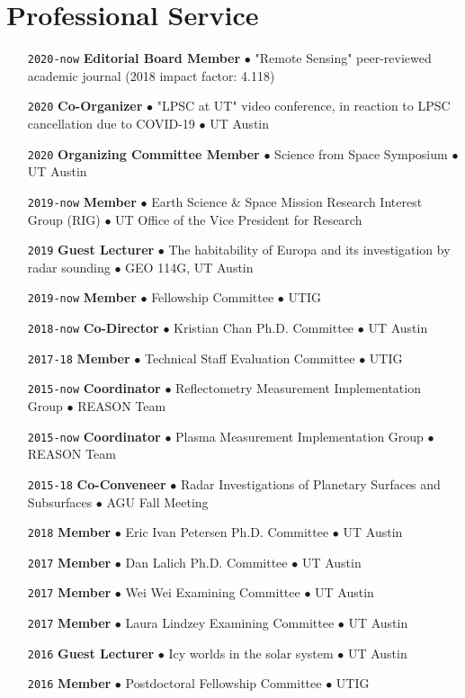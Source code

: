 \section*{Professional Service}

\begin{itemize}[leftmargin=5.8em, labelsep=1.5em]
    \setlength\itemsep{-.5em}
    \item[\texttt{2020-now}] \textbf{Editorial Board Member} $\bullet$ "Remote Sensing" peer-reviewed academic journal (2018 impact factor: 4.118)
    \item[\texttt{2020}] \textbf{Co-Organizer} $\bullet$ "LPSC at UT" video conference, in reaction to LPSC cancellation due to COVID-19 $\bullet$ UT Austin
    \item[\texttt{2020}] \textbf{Organizing Committee Member} $\bullet$ Science from Space Symposium $\bullet$ UT Austin
    \item[\texttt{2019-now}] \textbf{Member} $\bullet$ Earth Science \& Space Mission Research Interest Group (RIG) $\bullet$ UT Office of the Vice President for Research
    \item[\texttt{2019}] \textbf{Guest Lecturer} $\bullet$ The habitability of Europa and its investigation by radar sounding $\bullet$  GEO 114G, UT Austin
    \item[\texttt{2019-now}] \textbf{Member} $\bullet$ Fellowship Committee $\bullet$ UTIG
    \item[\texttt{2018-now}] \textbf{Co-Director} $\bullet$ Kristian Chan Ph.D. Committee $\bullet$ UT Austin
    \item[\texttt{2017-18}] \textbf{Member} $\bullet$ Technical Staff Evaluation Committee $\bullet$ UTIG
    \item[\texttt{2015-now}] \textbf{Coordinator} $\bullet$ Reflectometry Measurement Implementation Group $\bullet$ REASON Team
    \item[\texttt{2015-now}] \textbf{Coordinator} $\bullet$ Plasma Measurement Implementation Group $\bullet$ REASON Team
    \item[\texttt{2015-18}] \textbf{Co-Conveneer} $\bullet$  Radar Investigations of Planetary Surfaces and Subsurfaces $\bullet$ AGU Fall Meeting
    \item[\texttt{2018}] \textbf{Member} $\bullet$ Eric Ivan Petersen Ph.D. Committee $\bullet$ UT Austin
    \item[\texttt{2017}] \textbf{Member} $\bullet$ Dan Lalich Ph.D. Committee $\bullet$ UT Austin
    \item[\texttt{2017}] \textbf{Member} $\bullet$ Wei Wei Examining Committee $\bullet$ UT Austin
    \item[\texttt{2017}] \textbf{Member} $\bullet$ Laura Lindzey Examining Committee $\bullet$ UT Austin
    \item[\texttt{2016}] \textbf{Guest Lecturer} $\bullet$ Icy worlds in the solar system $\bullet$ UT Austin
    \item[\texttt{2016}] \textbf{Member} $\bullet$ Postdoctoral Fellowship Committee $\bullet$ UTIG
\end{itemize}

